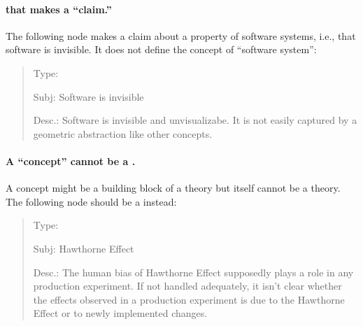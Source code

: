 \paragraph{ that makes a ``claim.''}

The following node makes a claim about a property of software systems,
i.e., that software is invisible. It does not define the concept of
``software system'':

\small
\begin{quote}
  \begin{itemizenoindent}

    \item {\sf Type}: 
 
\item {\sf Subj}: Software is invisible
 
\item {\sf Desc.}: Software is invisible and unvisualizabe.  It is not
  easily captured by a geometric abstraction like other concepts.
 \end{itemizenoindent}
\end{quote}
\normalsize
{}


\paragraph{A ``concept'' cannot be a .}

A concept might be a building block of a theory but itself cannot be a
theory. The following node should be a  instead:

\small
\begin{quote}
  \begin{itemizenoindent}
    
  \item {\sf Type}: 
 
  \item {\sf Subj}: Hawthorne Effect
 
\item {\sf Desc.}: The human bias of Hawthorne Effect supposedly plays a
  role in any production experiment.  If not handled adequately, it isn't
  clear whether the effects observed in a production experiment is due to the
  Hawthorne Effect or to newly implemented changes.

 \end{itemizenoindent}
\end{quote}
\normalsize
{}


